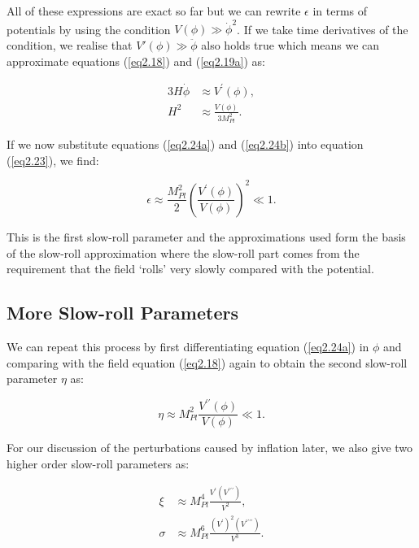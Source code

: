 \documentclass[a4paper,12pt,twoside]{report}
\begin{document}
All of these expressions are exact so far but we can rewrite $\epsilon$ in terms of potentials by using the condition $V(\phi) \gg \dot{\phi}^{2}$. If we take time derivatives of the condition, we realise that $V'(\phi) \gg \ddot{\phi}$ also holds true which means we can approximate equations (\ref{eq2.18}) and (\ref{eq2.19a}) as:

\begin{subequations}
\begin{align}
3H\dot{\phi} &\approx V^{\prime}(\phi), \label{eq2.24a} \\
H^{2} &\approx \frac{V(\phi)}{3M_{Pl}^{2}}. \label{eq2.24b}
\end{align}
\end{subequations}

If we now substitute equations (\ref{eq2.24a}) and (\ref{eq2.24b}) into equation (\ref{eq2.23}), we find:

\begin{equation} \label{eq2.25}
\epsilon \approx \frac{M_{Pl}^{2}}{2} \left(\frac{V^{\prime}(\phi)}{V(\phi)}\right)^{2} \ll 1.
\end{equation}

This is the first slow-roll parameter and the approximations used form the basis of the slow-roll approximation where the slow-roll part comes from the requirement that the field `rolls' very slowly compared with the potential.

\subsection{More Slow-roll Parameters} \label{subsec:MoreSrollPars}

We can repeat this process by first differentiating equation (\ref{eq2.24a}) in $\phi$ and comparing with the field equation (\ref{eq2.18}) again \cite{lyth2009primordial} to obtain the second slow-roll parameter $\eta$ as: 

\begin{equation} \label{eq2.26}
\eta \approx M_{Pl}^{2} \frac{V^{\prime \prime}(\phi)}{V(\phi)} \ll 1.
\end{equation}

For our discussion of the perturbations caused by inflation later, we also give two higher order slow-roll parameters \cite{lyth2009primordial} as:

\begin{subequations}
\begin{align}
\xi &\approx M_{Pl}^{4} \frac{V^{\prime}(V^{\prime \prime \prime})}{V^{2}}, \label{eq2.27a} \\
\sigma &\approx M_{Pl}^{6} \frac{(V^{\prime})^{2}(V^{\prime \prime \prime \prime})}{V^{3}}. \label{eq2.27b}
\end{align}
\end{subequations}
\end{document}
